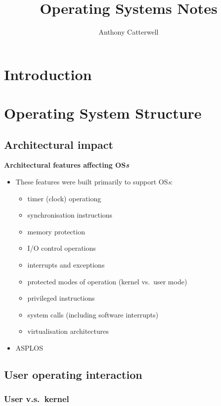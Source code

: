 \documentclass[11pt,a4paper]{article}
\title{Operating Systems Notes}
\author{Anthony Catterwell}
\begin{document}
\maketitle
\tableofcontents

\break{}

\section{Introduction}

\section{Operating System Structure}

\subsection{Architectural impact}

\textbf{Architectural features affecting OS\emph{s}}
\begin{itemize}
    \item These features were built primarily to support OS\emph{s}:
        \begin{itemize}
            \item timer (clock) operationg
            \item synchronisation instructions
            \item memory protection
            \item I/O control operations
            \item interrupts and exceptions
            \item protected modes of operation (kernel vs.\ user mode)
            \item privileged instructions
            \item system calls (including software interrupts)
            \item virtualisation architectures
        \end{itemize}
    \item ASPLOS
\end{itemize}

\subsection{User operating interaction}

\subsubsection{User v.s.\ kernel}
\end{document}
